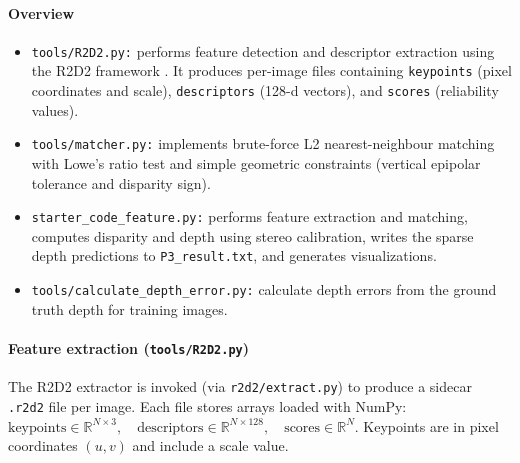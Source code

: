 \documentclass{rapport}
\begin{document}
\paragraph{Overview}
\begin{itemize}
    \item \texttt{tools/R2D2.py:} performs feature detection and descriptor extraction using the R2D2 framework \cite{r2d2}. It produces
        per-image files containing \texttt{keypoints} (pixel coordinates and scale), \texttt{descriptors} (128-d vectors), and
        \texttt{scores} (reliability values).
    \item \texttt{tools/matcher.py:} implements brute-force L2 nearest-neighbour matching with Lowe's ratio test and simple
        geometric constraints (vertical epipolar tolerance and disparity sign).
    \item \texttt{starter\_code\_feature.py:} performs feature extraction and matching, computes disparity and depth using
        stereo calibration, writes the sparse depth predictions to \texttt{P3\_result.txt}, and
        generates visualizations.
    \item \texttt{tools/calculate\_depth\_error.py:} calculate depth errors from the ground truth depth for training images.
    
\end{itemize}

\paragraph{Feature extraction (\texttt{tools/R2D2.py})}
The R2D2 extractor is invoked (via \texttt{r2d2/extract.py}) to produce a sidecar \texttt{.r2d2} file per image. Each
file stores arrays loaded with NumPy:
$ \text{keypoints}\in\mathbb{R}^{N\times 3},\quad\text{descriptors}\in\mathbb{R}^{N\times 128},\quad\text{scores}\in\mathbb{R}^N.$
Keypoints are in pixel coordinates $(u,v)$ and include a scale value.
\end{document}
